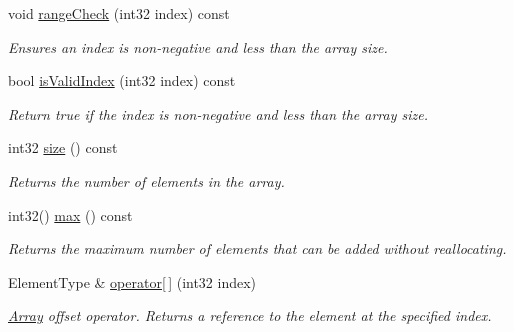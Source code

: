 \begin{DoxyCompactItemize}
void \mbox{\hyperlink{class_arcana_1_1_array_ab457f2db9ded37cbb2db24591eaf173d}{range\+Check}} (int32 index) const
\begin{DoxyCompactList}\small\item\em Ensures an index is non-\/negative and less than the array size. \end{DoxyCompactList}\item 
\mbox{\label{class_arcana_1_1_array_a0b1c26013b63c374bc9e980e364d6e14}} 
bool \mbox{\hyperlink{class_arcana_1_1_array_a0b1c26013b63c374bc9e980e364d6e14}{is\+Valid\+Index}} (int32 index) const
\begin{DoxyCompactList}\small\item\em Return true if the index is non-\/negative and less than the array size. \end{DoxyCompactList}\item 
\mbox{\label{class_arcana_1_1_array_a546fb9ca70679870ad1989969226c36f}} 
int32 \mbox{\hyperlink{class_arcana_1_1_array_a546fb9ca70679870ad1989969226c36f}{size}} () const
\begin{DoxyCompactList}\small\item\em Returns the number of elements in the array. \end{DoxyCompactList}\item 
\mbox{\label{class_arcana_1_1_array_a1dc82d25f171e88b12c4f6a2c3ca0a86}} 
int32() \mbox{\hyperlink{class_arcana_1_1_array_a1dc82d25f171e88b12c4f6a2c3ca0a86}{max}} () const
\begin{DoxyCompactList}\small\item\em Returns the maximum number of elements that can be added without reallocating. \end{DoxyCompactList}\item 
\mbox{\label{class_arcana_1_1_array_a3cb44835c75d9e1e3bce3bae208ec33e}} 
Element\+Type \& \mbox{\hyperlink{class_arcana_1_1_array_a3cb44835c75d9e1e3bce3bae208ec33e}{operator\mbox{[}$\,$\mbox{]}}} (int32 index)
\begin{DoxyCompactList}\small\item\em \mbox{\hyperlink{class_arcana_1_1_array}{Array}} offset operator. Returns a reference to the element at the specified index. \end{DoxyCompactList}\item 

\end{DoxyCompactItemize}
